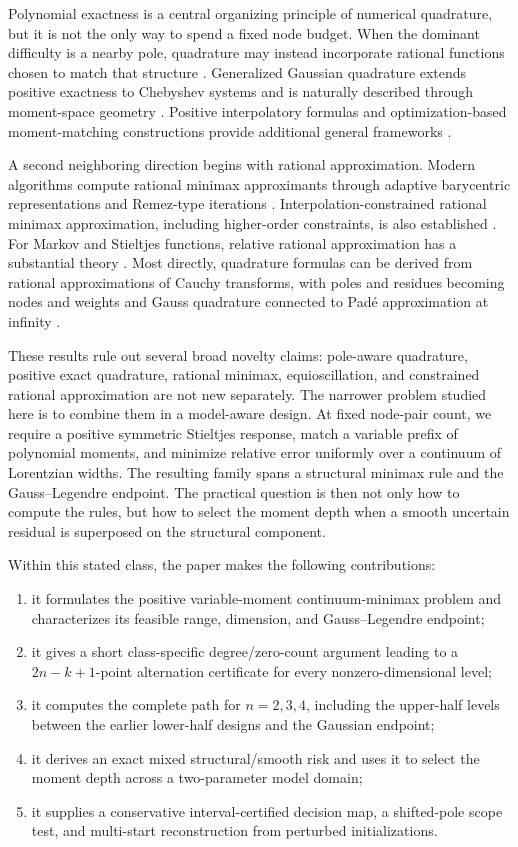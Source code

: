\documentclass[preprint,12pt]{elsarticle}
\theoremstyle{remark}
\begin{document}
Polynomial exactness is a central organizing principle of numerical
quadrature, but it is not the only way to spend a fixed node budget.
When the dominant difficulty is a nearby pole, quadrature may instead
incorporate rational functions chosen to match that structure
\cite{gautschi1993}. Generalized Gaussian quadrature extends positive
exactness to Chebyshev systems and is naturally described through
moment-space geometry \cite{huybrechs2017}. Positive interpolatory
formulas and optimization-based moment-matching constructions provide
additional general frameworks \cite{vandebos2019,glaubitz2020,
keshavarzzadeh2018}.

A second neighboring direction begins with rational approximation.
Modern algorithms compute rational minimax approximants through adaptive
barycentric representations and Remez-type iterations
\cite{filip2018}. Interpolation-constrained rational minimax
approximation, including higher-order constraints, is also established
\cite{zhang2025}. For Markov and Stieltjes functions, relative rational
approximation has a substantial theory \cite{beckermann2021}. Most
directly, quadrature formulas can be derived from rational
approximations of Cauchy transforms, with poles and residues becoming
nodes and weights and Gauss quadrature connected to Pad\'e approximation
at infinity \cite{horning2025}.

These results rule out several broad novelty claims: pole-aware
quadrature, positive exact quadrature, rational minimax,
equioscillation, and constrained rational approximation are not new
separately. The narrower problem studied here is to combine them in a
model-aware design. At fixed node-pair count, we require a positive
symmetric Stieltjes response, match a variable prefix of polynomial
moments, and minimize relative error uniformly over a continuum of
Lorentzian widths. The resulting family spans a structural minimax rule
and the Gauss--Legendre endpoint. The practical question is then not
only how to compute the rules, but how to select the moment depth when a
smooth uncertain residual is superposed on the structural component.

Within this stated class, the paper makes the following contributions:
\begin{enumerate}[label=(\roman*)]
\item it formulates the positive variable-moment continuum-minimax
problem and characterizes its feasible range, dimension, and
Gauss--Legendre endpoint;
\item it gives a short class-specific degree/zero-count argument leading
to a \(2n-k+1\)-point alternation certificate for every
nonzero-dimensional level;
\item it computes the complete path for \(n=2,3,4\), including the
upper-half levels between the earlier lower-half designs and the
Gaussian endpoint;
\item it derives an exact mixed structural/smooth risk and uses it to
select the moment depth across a two-parameter model domain;
\item it supplies a conservative interval-certified decision map, a shifted-pole
scope test, and multi-start reconstruction from perturbed initializations.
\end{enumerate}
\end{document}
